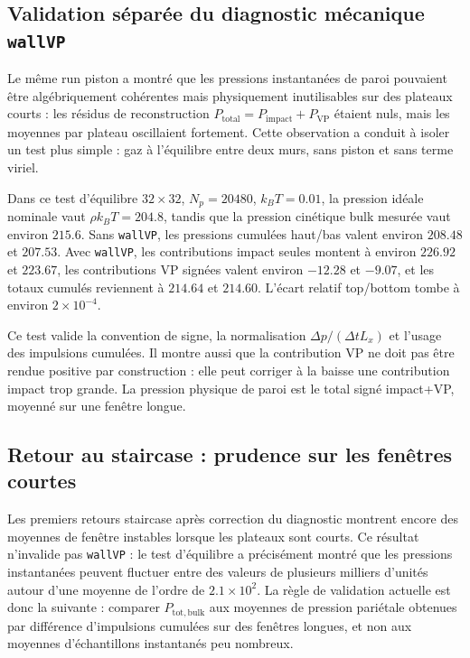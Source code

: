 \documentclass[11pt,a4paper]{article}
\begin{document}
\subsection{Validation séparée du diagnostic mécanique \texttt{wallVP}}

Le même run piston a montré que les pressions instantanées de paroi pouvaient être algébriquement cohérentes mais physiquement inutilisables sur des plateaux courts : les résidus de reconstruction \(P_{\mathrm{total}}=P_{\mathrm{impact}}+P_{\mathrm{VP}}\) étaient nuls, mais les moyennes par plateau oscillaient fortement. Cette observation a conduit à isoler un test plus simple : gaz à l'équilibre entre deux murs, sans piston et sans terme viriel.

Dans ce test d'équilibre \(32\times32\), \(N_p=20480\), \(k_BT=0.01\), la pression idéale nominale vaut \(\rho k_BT=204.8\), tandis que la pression cinétique bulk mesurée vaut environ \(215.6\). Sans \texttt{wallVP}, les pressions cumulées haut/bas valent environ \(208.48\) et \(207.53\). Avec \texttt{wallVP}, les contributions impact seules montent à environ \(226.92\) et \(223.67\), les contributions VP signées valent environ \(-12.28\) et \(-9.07\), et les totaux cumulés reviennent à \(214.64\) et \(214.60\). L'écart relatif top/bottom tombe à environ \(2\times10^{-4}\).

Ce test valide la convention de signe, la normalisation \(\Delta p/(\Delta t L_x)\) et l'usage des impulsions cumulées. Il montre aussi que la contribution VP ne doit pas être rendue positive par construction : elle peut corriger à la baisse une contribution impact trop grande. La pression physique de paroi est le total signé impact+VP, moyenné sur une fenêtre longue.

\subsection{Retour au staircase : prudence sur les fenêtres courtes}

Les premiers retours staircase après correction du diagnostic montrent encore des moyennes de fenêtre instables lorsque les plateaux sont courts. Ce résultat n'invalide pas \texttt{wallVP} : le test d'équilibre a précisément montré que les pressions instantanées peuvent fluctuer entre des valeurs de plusieurs milliers d'unités autour d'une moyenne de l'ordre de \(2.1\times10^2\). La règle de validation actuelle est donc la suivante : comparer \(P_{\mathrm{tot,bulk}}\) aux moyennes de pression pariétale obtenues par différence d'impulsions cumulées sur des fenêtres longues, et non aux moyennes d'échantillons instantanés peu nombreux.
\end{document}
